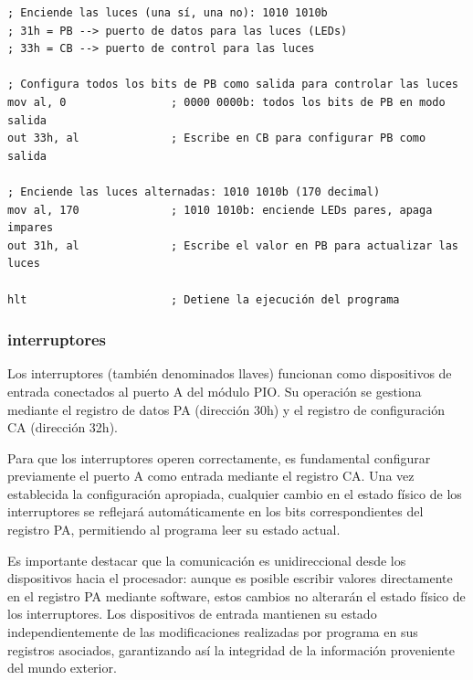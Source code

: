 \documentclass[12pt,oneside]{templates/unerthesis}
\begin{document}
\begin{lstlisting}
; Enciende las luces (una sí, una no): 1010 1010b
; 31h = PB --> puerto de datos para las luces (LEDs)
; 33h = CB --> puerto de control para las luces

; Configura todos los bits de PB como salida para controlar las luces
mov al, 0                ; 0000 0000b: todos los bits de PB en modo salida
out 33h, al              ; Escribe en CB para configurar PB como salida

; Enciende las luces alternadas: 1010 1010b (170 decimal)
mov al, 170              ; 1010 1010b: enciende LEDs pares, apaga impares
out 31h, al              ; Escribe el valor en PB para actualizar las luces

hlt                      ; Detiene la ejecución del programa\end{lstlisting}

\hypertarget{interruptores}{%
\subsubsection{interruptores}\label{interruptores}}

Los interruptores (también denominados llaves) funcionan como dispositivos de entrada conectados al puerto A del módulo PIO. Su operación se gestiona mediante el registro de datos PA (dirección 30h) y el registro de configuración CA (dirección 32h).

Para que los interruptores operen correctamente, es fundamental configurar previamente el puerto A como entrada mediante el registro CA. Una vez establecida la configuración apropiada, cualquier cambio en el estado físico de los interruptores se reflejará automáticamente en los bits correspondientes del registro PA, permitiendo al programa leer su estado actual.

Es importante destacar que la comunicación es unidireccional desde los dispositivos hacia el procesador: aunque es posible escribir valores directamente en el registro PA mediante software, estos cambios no alterarán el estado físico de los interruptores. Los dispositivos de entrada mantienen su estado independientemente de las modificaciones realizadas por programa en sus registros asociados, garantizando así la integridad de la información proveniente del mundo exterior.
\end{document}
